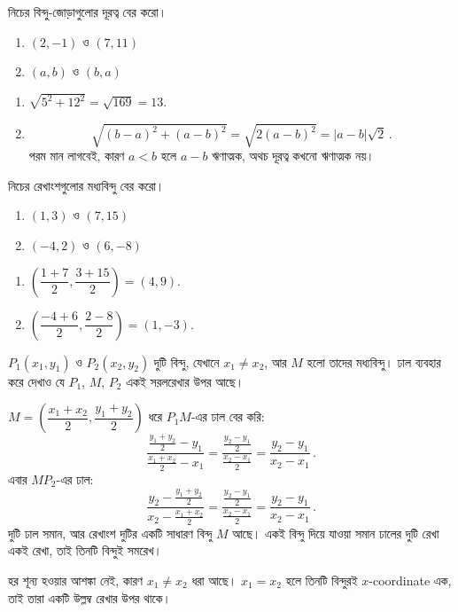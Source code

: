 \documentclass[11pt]{article}
\begin{document}
 নিচের বিন্দু-জোড়াগুলোর দূরত্ব বের করো।
\begin{enumerate}
  \item $(2, -1)$ ও $(7, 11)$
  \item $(a, b)$ ও $(b, a)$
\end{enumerate}

\begin{sol}
\begin{enumerate}
  \item $\sqrt{5^2 + 12^2} = \sqrt{169} = 13$.
  \item
        \[
          \sqrt{(b-a)^2 + (a-b)^2} = \sqrt{2(a-b)^2} = |a - b|\sqrt{2}\,.
        \]
        পরম মান লাগবেই, কারণ $a < b$ হলে $a - b$ ঋণাত্মক, অথচ দূরত্ব
        কখনো ঋণাত্মক নয়।
\end{enumerate}
\end{sol}

 নিচের রেখাংশগুলোর মধ্যবিন্দু বের করো।
\begin{enumerate}
  \item $(1, 3)$ ও $(7, 15)$
  \item $(-4, 2)$ ও $(6, -8)$
\end{enumerate}

\begin{sol}
\begin{enumerate}
  \item $\left( \dfrac{1+7}{2}, \dfrac{3+15}{2} \right) = (4, 9)$.
  \item $\left( \dfrac{-4+6}{2}, \dfrac{2-8}{2} \right) = (1, -3)$.
\end{enumerate}
\end{sol}

 $P_1(x_1, y_1)$ ও $P_2(x_2, y_2)$ দুটি বিন্দু, যেখানে
$x_1 \neq x_2$, আর $M$ হলো তাদের মধ্যবিন্দু। ঢাল ব্যবহার করে দেখাও যে
$P_1$, $M$, $P_2$ একই সরলরেখার উপর আছে।

\begin{sol}
$M = \left( \dfrac{x_1+x_2}{2}, \dfrac{y_1+y_2}{2} \right)$ ধরে $P_1M$-এর ঢাল
বের করি:
\[
  \frac{\frac{y_1+y_2}{2} - y_1}{\frac{x_1+x_2}{2} - x_1}
  = \frac{\frac{y_2-y_1}{2}}{\frac{x_2-x_1}{2}}
  = \frac{y_2 - y_1}{x_2 - x_1}\,.
\]
এবার $MP_2$-এর ঢাল:
\[
  \frac{y_2 - \frac{y_1+y_2}{2}}{x_2 - \frac{x_1+x_2}{2}}
  = \frac{\frac{y_2-y_1}{2}}{\frac{x_2-x_1}{2}}
  = \frac{y_2 - y_1}{x_2 - x_1}\,.
\]
দুটি ঢাল সমান, আর রেখাংশ দুটির একটি সাধারণ বিন্দু $M$ আছে। একই বিন্দু দিয়ে
যাওয়া সমান ঢালের দুটি রেখা একই রেখা, তাই তিনটি বিন্দুই সমরেখ।

হর শূন্য হওয়ার আশঙ্কা নেই, কারণ $x_1 \neq x_2$ ধরা আছে। $x_1 = x_2$ হলে
তিনটি বিন্দুরই $x$-coordinate এক, তাই তারা একটি উল্লম্ব রেখার উপর থাকে।
\end{sol}
\end{document}

